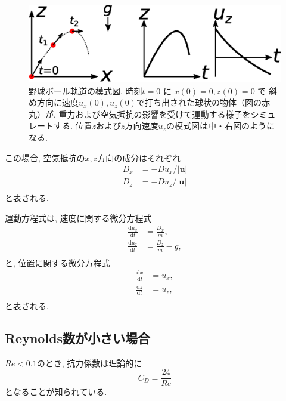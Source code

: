 \begin{figure}[ht]
\centering
\includegraphics[width=0.8\linewidth]{9_fortran6/figs/shahou.eps}
\caption{野球ボール軌道の模式図. 時刻$t = 0$ に $x(0)=0, z(0)=0$ で
斜め方向に速度$u_x(0), u_z(0)$で打ち出された球状の物体（図の赤丸）が, 
重力および空気抵抗の影響を受けて運動する様子をシミュレートする. 
位置$z$および$z$方向速度$u_z$の模式図は中・右図のようになる. }
\end{figure}

この場合, 空気抵抗の$x, z$方向の成分はそれぞれ
\begin{equation}
  \begin{aligned}
    D_x &= -D u_x / |\mathbf{u}| \\
    D_z &= -D u_z / |\mathbf{u}| \\
  \end{aligned}
\end{equation}
と表される. 

運動方程式は, 速度に関する微分方程式
\begin{equation}
  \begin{aligned}
    \frac{\mathrm{d}u_x}{\mathrm{d}t} &= \frac{D_x}{m},\\
    \frac{\mathrm{d}u_z}{\mathrm{d}t} &= \frac{D_z}{m} - g,\\
  \end{aligned}
\end{equation}
と, 位置に関する微分方程式
\begin{equation}
  \begin{aligned}
    \frac{\mathrm{d}x}{\mathrm{d}t} &= u_x,\\
    \frac{\mathrm{d}z}{\mathrm{d}t} &= u_z,\\
  \end{aligned}
\end{equation}
と表される. 


\subsection{Reynolds数が小さい場合}
$Re<0.1$のとき, 抗力係数は理論的に
\begin{equation}
C_D=\frac{24}{Re}
\end{equation}
となることが知られている.

